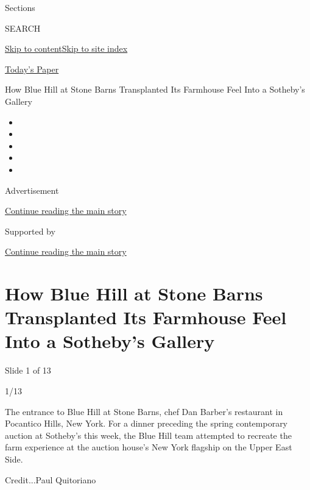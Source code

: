 Sections

SEARCH

\protect\hyperlink{site-content}{Skip to
content}\protect\hyperlink{site-index}{Skip to site index}

\href{https://myaccount.nytimes3xbfgragh.onion/auth/login?response_type=cookie\&client_id=vi}{}

\href{https://www.nytimes3xbfgragh.onion/section/todayspaper}{Today's
Paper}

How Blue Hill at Stone Barns Transplanted Its Farmhouse Feel Into a
Sotheby's Gallery

\begin{itemize}
\item
\item
\item
\item
\item
\end{itemize}

Advertisement

\protect\hyperlink{after-top}{Continue reading the main story}

Supported by

\protect\hyperlink{after-sponsor}{Continue reading the main story}

\hypertarget{how-blue-hill-at-stone-barns-transplanted-its-farmhouse-feel-into-a-sothebys-gallery}{%
\section{How Blue Hill at Stone Barns Transplanted Its Farmhouse Feel
Into a Sotheby's
Gallery}\label{how-blue-hill-at-stone-barns-transplanted-its-farmhouse-feel-into-a-sothebys-gallery}}

Slide 1 of 13

1/13

The entrance to Blue Hill at Stone Barns, chef Dan Barber's restaurant
in Pocantico Hills, New York. For a dinner preceding the spring
contemporary auction at Sotheby's this week, the Blue Hill team
attempted to recreate the farm experience at the auction house's New
York flagship on the Upper East Side.

Credit...Paul Quitoriano

